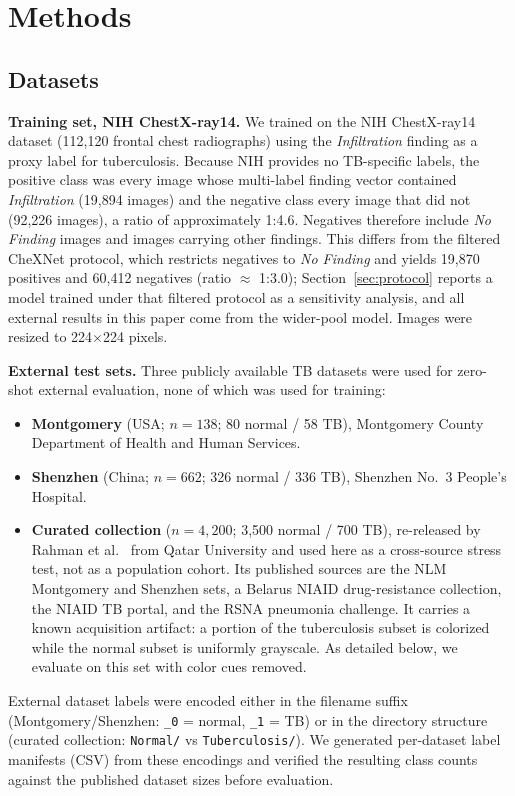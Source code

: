 \documentclass[runningheads]{llncs}
\begin{document}
\section{Methods}
\subsection{Datasets}\label{sec:data}
\textbf{Training set, NIH ChestX-ray14.} We trained on the NIH ChestX-ray14 dataset (112,120 frontal chest radiographs) using the \emph{Infiltration} finding as a proxy label for tuberculosis. Because NIH provides no TB-specific labels, the positive class was every image whose multi-label finding vector contained \emph{Infiltration} (19,894 images) and the negative class every image that did not (92,226 images), a ratio of approximately 1:4.6. Negatives therefore include \emph{No Finding} images and images carrying other findings. This differs from the filtered CheXNet protocol, which restricts negatives to \emph{No Finding} and yields 19,870 positives and 60,412 negatives (ratio $\approx$ 1:3.0); Section~\ref{sec:protocol} reports a model trained under that filtered protocol as a sensitivity analysis, and all external results in this paper come from the wider-pool model. Images were resized to 224$\times$224 pixels.

\textbf{External test sets.} Three publicly available TB datasets were used for zero-shot external evaluation, none of which was used for training:
\begin{itemize}
\item \textbf{Montgomery} (USA; $n=138$; 80 normal / 58 TB), Montgomery County Department of Health and Human Services.
\item \textbf{Shenzhen} (China; $n=662$; 326 normal / 336 TB), Shenzhen No.~3 People's Hospital.
\item \textbf{Curated collection} ($n=4{,}200$; 3,500 normal / 700 TB), re-released by Rahman et al.~\cite{rahman2020} from Qatar University and used here as a cross-source stress test, not as a population cohort. Its published sources are the NLM Montgomery and Shenzhen sets, a Belarus NIAID drug-resistance collection, the NIAID TB portal, and the RSNA pneumonia challenge. It carries a known acquisition artifact: a portion of the tuberculosis subset is colorized while the normal subset is uniformly grayscale. As detailed below, we evaluate on this set with color cues removed.
\end{itemize}
External dataset labels were encoded either in the filename suffix (Montgomery/Shenzhen: \texttt{\_0} = normal, \texttt{\_1} = TB) or in the directory structure (curated collection: \texttt{Normal/} vs \texttt{Tuberculosis/}). We generated per-dataset label manifests (CSV) from these encodings and verified the resulting class counts against the published dataset sizes before evaluation.
\end{document}

